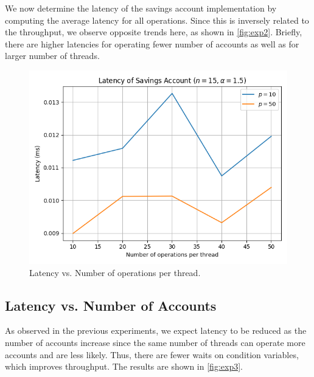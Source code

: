 \documentclass[conference,compsoc]{IEEEtran}
\begin{document}
We now determine the latency of the savings account implementation by computing
the average latency for all operations. Since this is inversely related to the
throughput, we observe opposite trends here, as shown in \autoref{fig:exp2}.
Briefly, there are higher latencies for operating fewer number of accounts as
well as for larger number of threads.

\begin{figure}[!ht]
    \centering
    \includegraphics[width=\columnwidth]{images/exp2.png}
    \caption{Latency vs. Number of operations per thread.}
    \label{fig:exp2}
\end{figure}

\subsection{Latency vs. Number of Accounts}
As observed in the previous experiments, we expect latency to be reduced as the
number of accounts increase since the same number of threads can operate more
accounts and are less likely. Thus, there are fewer waits on condition
variables, which improves throughput. The results are shown in
\autoref{fig:exp3}.
\end{document}
